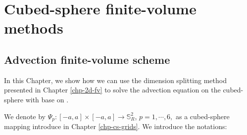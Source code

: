 \chapter{Cubed-sphere finite-volume methods}
\label{chp-cs-fv}

\section{Advection finite-volume scheme}
In this Chapter, we show how we can use the dimension splitting method
presented in Chapter \ref{chp-2d-fv} to solve the advection
equation on the cubed-sphere with base on \citet{putman:2007}.

We denote by $\Psi_p:[-a,a] \times [-a,a] \to \mathbb{S}^2_R$,
$p=1, \cdots, 6,$ as a cubed-sphere mapping introduce in Chapter \ref{chp-cs-grids}.
We introduce the notations:


